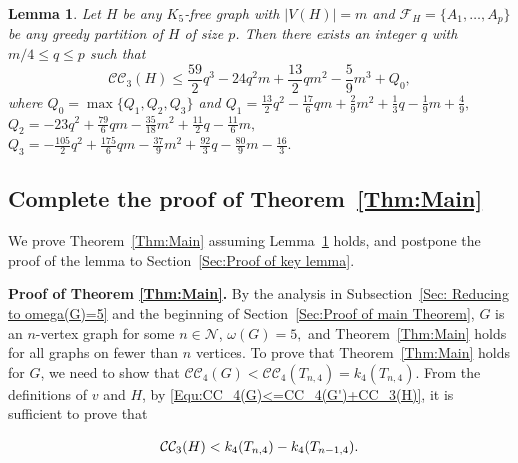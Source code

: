 \documentclass[11pt,a4paper]{article}
\newtheorem{lem}[dfn]{Lemma}
\newcommand{\dN}{{\mathcal{N}}}
\newcommand{\turangraph}[2]{T_{#1,#2}}
\newcommand{\coveropt}[2]{{\mathcal{C}\mathcal{C}_{#1}(#2)}}
\begin{document}
\begin{lem}\label{Lem:key lemma}
    Let $H$ be any $K_5$-free graph with $|V(H)| = m$ and $\mathcal{F}_H = \{A_1,\dots,A_p\}$ be any greedy partition of $H$ of size $p$. 
    Then there exists an integer $q$ with $m/4 \leq q \leq p$ such that       
    $$
    \coveropt{3}{H}\le \frac{59}{2}q^3 -24q^2m +\frac{13}{2}qm^2 -\frac{5}{9}m^3+Q_0,
    $$
where 
$Q_0=\max\{Q_1,Q_2,Q_3\}$
    and 
         $Q_1=\frac{13}{2}q^2-\frac{17}{6}qm+\frac{2}{9}m^2+\frac{1}{3}q-\frac{1}{9}m+\frac{4}{9},$
         $Q_2=-23q^2+\frac{79}{6}qm-\frac{35}{18}m^2+\frac{11}{2}q-\frac{11}{6}m,$
         $Q_3=-\frac{105}{2}q^2+\frac{175}{6}qm-\frac{37}{9}m^2+\frac{92}{3}q-\frac{80}{9}m-\frac{16}{3}.$
\end{lem}


\subsection{Complete the proof of Theorem~\ref{Thm:Main}}\label{Subsec:proof of main thm}
We prove Theorem~\ref{Thm:Main} assuming Lemma~\ref{Lem:key lemma} holds, and postpone the proof of the lemma to Section~\ref{Sec:Proof of key lemma}.

\noindent
\textbf{Proof of Theorem \ref{Thm:Main}.}
By the analysis in Subsection~\ref{Sec: Reducing to omega(G)=5} and the beginning of Section~\ref{Sec:Proof of main Theorem}, 
$G$ is an $n$-vertex graph for some $n\in \dN$,
$\omega(G)=5,$ and
Theorem~\ref{Thm:Main} holds for all graphs on fewer than $n$ vertices.
To prove that Theorem~\ref{Thm:Main} holds for $G$, 
we need to show that 
$\coveropt{4}{G} < \coveropt{4}{\turangraph{n}{4}}=k_4(\turangraph{n}{4}).$ 
From the definitions of $v$ and $H$, by \eqref{Equ:CC_4(G)<=CC_4(G')+CC_3(H)}, it is sufficient to prove that

\begin{equation}\label{Equ:cc_3(H)<k_4(\turangraph{n}{4})-k_4(\turangraph{n-1}{4})}
    \coveropt{3}{H}< k_4(\turangraph{n}{4})-k_4(\turangraph{n-1}{4}).
\end{equation}
\end{document}
